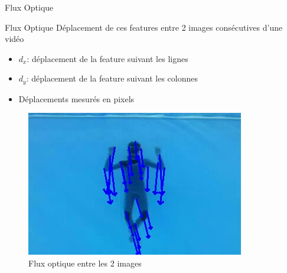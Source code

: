 \documentclass{bredelebeamer}
\begin{document}
\begin{frame}{Flux Optique}

\begin{alertblock}{Flux Optique}
Déplacement de ces features entre 2 images consécutives d'une vidéo
\begin{itemize}
	\item $d_{x}$: déplacement de la feature suivant les lignes
	\item $d_{y}$: déplacement de la feature suivant les colonnes
	\item Déplacements mesurés en pixels
\end{itemize}
\end{alertblock}

\begin{figure}
\centering
\includegraphics[scale=0.4]{images/plongeurOpticalFlow.jpeg}
\caption{Flux optique entre les 2 images}
\end{figure}

\end{frame}

\end{document}
